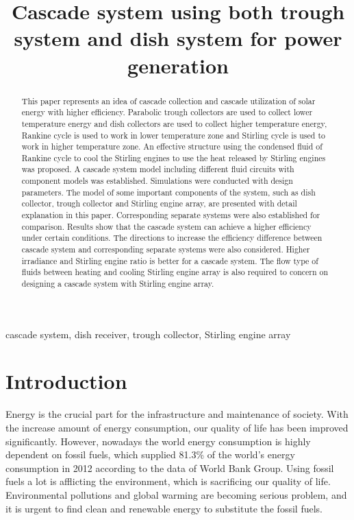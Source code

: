 \documentclass{article}
\begin{document}
\title{Cascade system using both trough system and dish system for power generation}
\date{}
\author{}
\maketitle

\begin{abstract}
This paper represents an idea of cascade collection and cascade utilization of solar energy with higher efficiency. Parabolic trough collectors are used to collect lower temperature energy and dish collectors are used to collect higher temperature energy, Rankine cycle is used to work in lower temperature zone and Stirling cycle is used to work in higher temperature zone. An effective structure using the condensed fluid of Rankine cycle to cool the Stirling engines to use the heat released by Stirling engines was proposed. A cascade system model including different fluid circuits with component models was established. Simulations were conducted with design parameters. The model of some important components of the system, such as dish collector, trough collector and Stirling engine array, are presented with detail explanation in this paper. Corresponding separate systems were also established for comparison. Results show that the cascade system can achieve a higher efficiency under certain conditions. The directions to increase the efficiency difference between cascade system and corresponding separate systems were also considered. Higher irradiance and Stirling engine ratio is better for a cascade system. The flow type of fluids between heating and cooling Stirling engine array is also required to concern on designing a cascade system with Stirling engine array.
\end{abstract}

 cascade system, dish receiver, trough collector, Stirling engine array
\newpage{}

\section{Introduction}

Energy is the crucial part for the infrastructure and maintenance of  society. With the increase amount of energy consumption, our quality of life has been improved significantly. However, nowadays the world energy consumption is highly dependent on fossil fuels, which supplied 81.3\% of the world's energy consumption in 2012 according to the data of World Bank Group. Using fossil fuels a lot is afflicting the environment, which is sacrificing our quality of life. Environmental pollutions and global warming are becoming serious problem, and it is urgent to find clean and renewable energy to substitute the fossil fuels.
\end{document}
